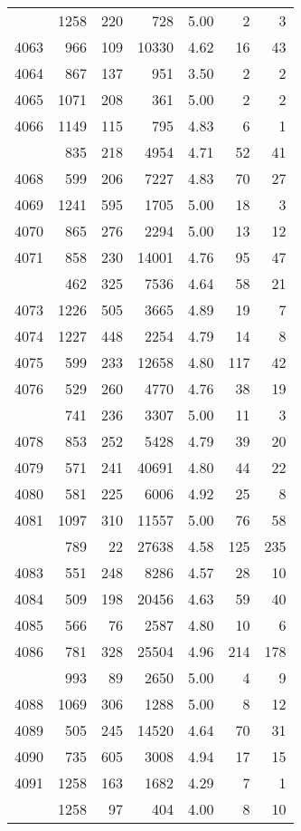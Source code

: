 \documentclass[
]{article}
\begin{document}
\begin{table}
\begin{tabular}[t]{lrrrrrr}
\addlinespace
4062 & 1258 & 220 & 728 & 5.00 & 2 & 3\\
4063 & 966 & 109 & 10330 & 4.62 & 16 & 43\\
4064 & 867 & 137 & 951 & 3.50 & 2 & 2\\
4065 & 1071 & 208 & 361 & 5.00 & 2 & 2\\
4066 & 1149 & 115 & 795 & 4.83 & 6 & 1\\
\addlinespace
4067 & 835 & 218 & 4954 & 4.71 & 52 & 41\\
4068 & 599 & 206 & 7227 & 4.83 & 70 & 27\\
4069 & 1241 & 595 & 1705 & 5.00 & 18 & 3\\
4070 & 865 & 276 & 2294 & 5.00 & 13 & 12\\
4071 & 858 & 230 & 14001 & 4.76 & 95 & 47\\
\addlinespace
4072 & 462 & 325 & 7536 & 4.64 & 58 & 21\\
4073 & 1226 & 505 & 3665 & 4.89 & 19 & 7\\
4074 & 1227 & 448 & 2254 & 4.79 & 14 & 8\\
4075 & 599 & 233 & 12658 & 4.80 & 117 & 42\\
4076 & 529 & 260 & 4770 & 4.76 & 38 & 19\\
\addlinespace
4077 & 741 & 236 & 3307 & 5.00 & 11 & 3\\
4078 & 853 & 252 & 5428 & 4.79 & 39 & 20\\
4079 & 571 & 241 & 40691 & 4.80 & 44 & 22\\
4080 & 581 & 225 & 6006 & 4.92 & 25 & 8\\
4081 & 1097 & 310 & 11557 & 5.00 & 76 & 58\\
\addlinespace
4082 & 789 & 22 & 27638 & 4.58 & 125 & 235\\
4083 & 551 & 248 & 8286 & 4.57 & 28 & 10\\
4084 & 509 & 198 & 20456 & 4.63 & 59 & 40\\
4085 & 566 & 76 & 2587 & 4.80 & 10 & 6\\
4086 & 781 & 328 & 25504 & 4.96 & 214 & 178\\
\addlinespace
4087 & 993 & 89 & 2650 & 5.00 & 4 & 9\\
4088 & 1069 & 306 & 1288 & 5.00 & 8 & 12\\
4089 & 505 & 245 & 14520 & 4.64 & 70 & 31\\
4090 & 735 & 605 & 3008 & 4.94 & 17 & 15\\
4091 & 1258 & 163 & 1682 & 4.29 & 7 & 1\\
\addlinespace
4092 & 1258 & 97 & 404 & 4.00 & 8 & 10\\

\end{tabular}
\end{table}
\end{document}
